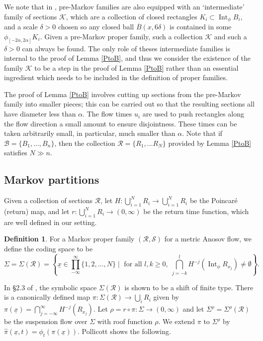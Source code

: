 \documentclass[10pt]{amsart}
\let\mathcal\mathscr
\let\sep\mid
\theoremstyle{definition}
\newtheorem{defn}[thm]{Definition}
\numberwithin{equation}{section}
\DeclareMathOperator{\Int}{Int}
\newcommand\KKK{\mathcal K}
\newcommand\BBB{\mathcal B}
\newcommand\RRR{\mathcal R}
\newcommand\SSS{\mathcal S}
\begin{document}
We note that in \cite{bowen-symbolic, pollicott}, pre-Markov families are also equipped with an `intermediate' family of sections $\KKK$, which are a collection of closed rectangles $K_i \subset \Int_\phi B_i$, and a scale $\delta>0$ chosen so any closed ball $\overline B(x, 6\delta)$ is contained in some $\phi_{[-2 \alpha, 2 \alpha]}K_i$. Given a pre-Markov proper family, such a collection $\KKK$ and such a $\delta>0$ can always be found. The only role of theses intermediate families is internal to the proof of Lemma \ref{PtoB}, and thus we consider the existence of the family $\KKK$ to be a step in the proof of Lemma \ref{PtoB} rather than an essential ingredient which needs to be included in the definition of proper families.

The proof of Lemma \ref{PtoB} involves cutting up sections from the pre-Markov family into smaller pieces; this can be carried out so that the resulting sections all have diameter less than $\alpha$. The flow times $u_i$ are used to push rectangles along the flow direction a small amount to ensure disjointness. These times can be taken arbitrarily small, in particular, much smaller than $\alpha$. Note that if $\BBB = \{B_1, \ldots, B_n\}$, then the collection $\RRR= \{R_1, \ldots R_N\}$ provided by Lemma \ref{PtoB} satisfies $N \gg  n$.

\subsection{Markov partitions}

Given a collection of sections $\RRR$, let $H: \bigcup_{i=1}^N R_i \to \bigcup_{i=1}^N R_i$ be the Poincaré (return) map, and let $r: \bigcup_{i=1}^N R_i \to (0, \infty)$ be the return time function, which are well defined in our setting.

\begin{defn}
For a Markov proper family $(\RRR, \SSS)$ for a metric Anosov flow, we define the coding space to be
\[\textstyle \Sigma=\Sigma(\RRR)= \left \{ \underline x \in \prod_{-\infty}^{\infty}\{1, 2, \ldots, N\} \sep \text{ for all } l, k \geq 0,\; \bigcap_{j=-k}^l H^{-j}( \Int_\phi R_{x_j}) \neq \emptyset \right \}. \]
\end{defn}

In \S2.3 of \cite{pollicott}, the symbolic space $\Sigma(\RRR)$ is shown to be a shift of finite type. There is a canonically defined map $\pi: \Sigma(\RRR) \to \bigcup_i R_i$ given by $\pi(\underline x) = \bigcap_{j=-\infty}^\infty H^{-j}(R_{x_j})$. Let $\rho= r \circ \pi: \Sigma \to (0, \infty)$ and let $\Sigma^\rho=\Sigma^\rho(\RRR)$ be the suspension flow over $\Sigma$ with roof function $\rho$. We extend $\pi$ to $\Sigma^\rho$ by $\hat \pi(\underline x, t) = \phi_t(\pi(\underline x))$. Pollicott shows the following.
\end{document}
